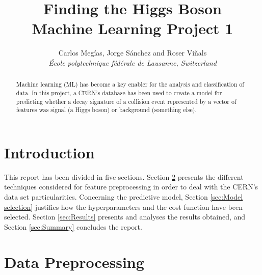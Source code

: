 \documentclass[10pt,conference,compsocconf]{IEEEtran}
\begin{document}
\title{Finding the Higgs Boson \\ Machine Learning Project 1}

\author{
  Carlos Meg\'ias, Jorge S\'anchez and Roser Vi\~nals\\
  \textit{\'Ecole polytechnique f\'ed\'erale de Lausanne, Switzerland}
}

\maketitle

\begin{abstract}
  Machine learning (ML) has become a key enabler for the analysis and classification of data. In this project, a CERN's database has been used to create a model for predicting whether a decay signature of a collision event represented by a vector of features was signal (a Higgs boson) or background (something else).
  
\end{abstract}

\section{Introduction}
This report has been divided in five sections. Section \ref{sec:FeatureProcessing} presents the different techniques considered for feature preprocessing in order to deal with the CERN's data set particularities. Concerning the predictive model, Section \ref{sec:Model selection} justifies how the hyperparameters and the cost function have been selected. Section \ref{sec:Results} presents and analyses the results obtained, and Section \ref{sec:Summary} concludes the report.
\section{Data Preprocessing}
\label{sec:FeatureProcessing}
\end{document}
